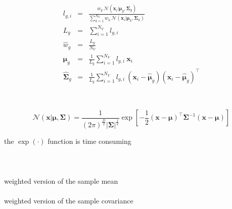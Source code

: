 \documentclass[usenames,dvipsnames]{beamer}
\def\Vec#1{{\boldsymbol{#1}}}
\def\Mat#1{{\boldsymbol{#1}}}
\begin{document}
\begin{frame}
\begin{enumerate}[{~~$\boldsymbol{\bullet}$}]
\begin{minipage}{1\textwidth}
\begin{minipage}{0.45\textwidth}
\centering
%
\begin{eqnarray*}
  l_{g,i}                  & = & \frac{w_g ~ {{\mathcal{N}}}( \Vec{x}_i | \Vec{\mu}_g, \Mat{\Sigma}_g )}{\sum\nolimits_{k=1}^{N_G} w_k ~ {{\mathcal{N}}}( \Vec{x}_i | \Vec{\mu}_k, \Mat{\Sigma}_k )} \\
  L_g                      & = & \sum\nolimits_{i=1}^{N_V} l_{g,i} \\
  \widehat{w}_g            & = & \frac{L_g}{N_V} \\
  \widehat{\Vec{\mu}}_g    & = & \frac{1}{L_g} \sum\nolimits_{i=1}^{N_V} l_{g,i} ~ \Vec{x}_i \\
  \widehat{\Mat{\Sigma}}_g & = & \frac{1}{L_g} \sum\nolimits_{i=1}^{N_V} l_{g,i} ~ (\Vec{x}_i - \widehat{\Vec{\mu}}_g)(\Vec{x}_i - \widehat{\Vec{\mu}}_g)^\top 
\end{eqnarray*}
\end{minipage}
~
\begin{minipage}{0.45\textwidth}
\begin{tiny}%
\begin{equation*}
  {{\mathcal{N}}}( \Vec{x} | \Vec{\mu}, \Mat{\Sigma} )  = 
  \frac{1}{ (2\pi)^{\frac{D}{2}} | \Mat{\Sigma}|^{\frac{1}{2}} }
  \exp \left[ -\frac{1}{2} (\Vec{x}-\Vec{\mu})^\top \Mat{\Sigma}^{-1} (\Vec{x}-\Vec{\mu}) \right]
\end{equation*}%
\end{tiny}%
the $\exp(\cdot)$ function is time consuming\\
~\\
~\\
~\\
weighted version of the sample mean\\
~\\
weighted version of the sample covariance\\
~\\
\end{minipage}

\end{minipage}




\end{enumerate}
\end{frame}
\end{document}
